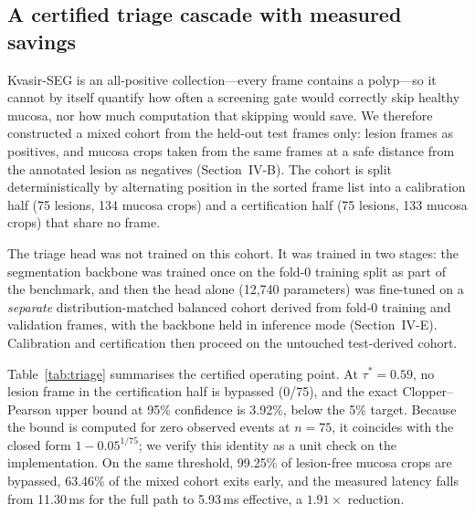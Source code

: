\documentclass[journal]{IEEEtran}
\begin{document}
\subsection{A certified triage cascade with measured savings}

Kvasir-SEG is an all-positive collection---every frame contains a polyp---so it cannot by itself quantify how often a screening gate would correctly skip healthy mucosa, nor how much computation that skipping would save. We therefore constructed a mixed cohort from the held-out test frames only: lesion frames as positives, and mucosa crops taken from the same frames at a safe distance from the annotated lesion as negatives (Section~IV-B). The cohort is split deterministically by alternating position in the sorted frame list into a calibration half (75 lesions, 134 mucosa crops) and a certification half (75 lesions, 133 mucosa crops) that share no frame.

The triage head was not trained on this cohort. It was trained in two stages: the segmentation backbone was trained once on the fold-0 training split as part of the benchmark, and then the head alone (12{,}740 parameters) was fine-tuned on a \emph{separate} distribution-matched balanced cohort derived from fold-0 training and validation frames, with the backbone held in inference mode (Section~IV-E). Calibration and certification then proceed on the untouched test-derived cohort.

Table~\ref{tab:triage} summarises the certified operating point. At $\tau^{*}=0.59$, no lesion frame in the certification half is bypassed (0/75), and the exact Clopper--Pearson upper bound at 95\% confidence is 3.92\%, below the 5\% target. Because the bound is computed for zero observed events at $n=75$, it coincides with the closed form $1-0.05^{1/75}$; we verify this identity as a unit check on the implementation. On the same threshold, 99.25\% of lesion-free mucosa crops are bypassed, 63.46\% of the mixed cohort exits early, and the measured latency falls from 11.30\,ms for the full path to 5.93\,ms effective, a $1.91\times$ reduction.
\end{document}

